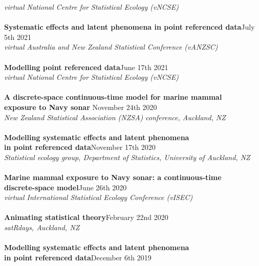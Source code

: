 \documentclass[10pt,letter]{article}
\begin{document}
                 {\sl virtual National Centre for Statistical Ecology (vNCSE)}\\
                 \hdashrule[0.5ex]{4cm}{1pt}{1pt}\\
 {\textbf{Systematic effects and latent phenomena in point referenced data}}\hfill July 5th 2021\\
                 {\sl virtual Australia and New Zealand Statistical Conference (vANZSC)}\\
                 \hdashrule[0.5ex]{4cm}{1pt}{1pt}\\
                  {\textbf{Modelling point referenced data}}\hfill June 17th 2021\\
                 {\sl virtual National Centre for Statistical Ecology (vNCSE)}\\
                 \hdashrule[0.5ex]{4cm}{1pt}{1pt}\\
{\textbf{A discrete-space continuous-time model for marine mammal \\
           exposure to Navy sonar }}\hfill November 24th 2020\\
       {\sl New Zealand Statistical Association (NZSA) conference, Auckland, NZ}\\
       \hdashrule[0.5ex]{4cm}{1pt}{1pt}\\
{\textbf{Modelling systematic effects and latent phenomena \\
                     in point referenced data}}\hfill November 17th 2020\\
                 {\sl Statistical ecology group, Department of Statistics, University of Auckland, NZ}\\
                 \hdashrule[0.5ex]{4cm}{1pt}{1pt}\\
{\textbf{Marine mammal exposure to Navy sonar: a continuous-time \\
                     discrete-space model}}\hfill June 26th 2020\\
                 {\sl virtual International Statistical Ecology Conference (vISEC)}\\
                 \hdashrule[0.5ex]{4cm}{1pt}{1pt}\\
                           {\textbf{Animating statistical theory}}\hfill February 22nd 2020\\
                           {\sl satRdays, Auckland, NZ}\\
                           \hdashrule[0.5ex]{4cm}{1pt}{1pt}\\
                           {\textbf{Modelling systematic effects and latent phenomena \\
                                         in point referenced data}}\hfill December 6th 2019\\
\end{document}
